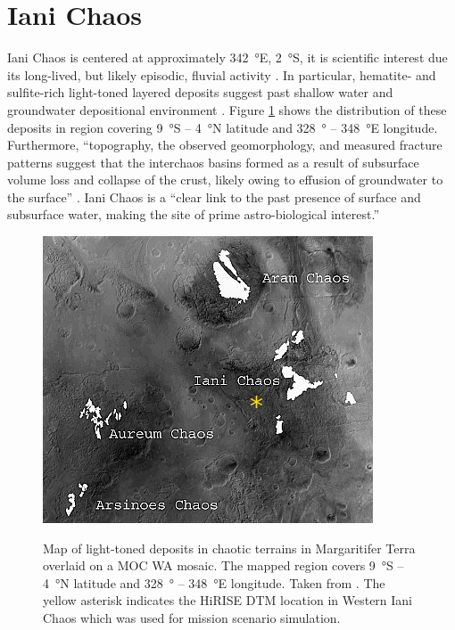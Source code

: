\section{Iani Chaos}
\label{sec:MissionSites:IaniChaos}
Iani Chaos is centered at approximately \SI{342}{\degree}E, \SI{2}{\degree}S, it is scientific interest due its long-lived, but likely episodic, fluvial activity . In particular, hematite- and sulfite-rich light-toned layered deposits suggest past shallow water and groundwater depositional environment . Figure \ref{fig:mission-site-iani-chaos} shows the distribution of these deposits in region covering \SI{9}{\degree}S – \SI{4}{\degree}N latitude and \SI{328}{\degree} – \SI{348}{\degree}E longitude. Furthermore, ``topography, the observed geomorphology, and measured fracture patterns suggest that the interchaos basins formed as a result of subsurface volume loss and collapse of the crust, likely owing to effusion of groundwater to the surface'' . Iani Chaos is a ``clear link to the past presence of surface and subsurface water, making the site of prime astro-biological interest.'' 

\begin{figure}[h]
  \centering
  \hypersetup{linkcolor=captionTextColor}
  \includegraphics[width=0.5\linewidth]{sections/mission-sites/images/iani-chaos-deposits.png}\\
  \caption[Map of light‐toned deposits in chaotic terrains in Margaritifer Terra overlaid on a \ac{MOC} \ac{WA} mosaic]
          {Map of light‐toned deposits in chaotic terrains in Margaritifer Terra overlaid on a \ac{MOC} \ac{WA} mosaic. The mapped region covers \SI{9}{\degree}S – \SI{4}{\degree}N latitude and \SI{328}{\degree} – \SI{348}{\degree}E longitude. Taken from . The yellow asterisk indicates the \ac{HiRISE} \ac{DTM} location in Western Iani Chaos which was used for mission scenario simulation.}
  \label{fig:mission-site-iani-chaos}
\end{figure}

